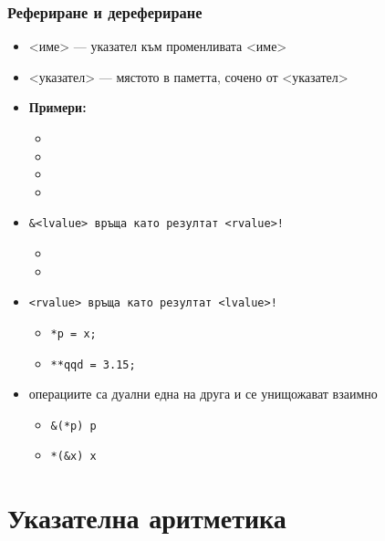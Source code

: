 \documentclass{beamer}
\begin{document}
\begin{frame}
  \frametitle{Рефериране и дерефериране}

  \begin{itemize}[<+->]
  \item \tta{\&}<име> --- указател към променливата <име>
  \item \tta*<указател> --- мястото в паметта, сочено от <указател>
  \item \textbf{Примери:}
    \begin{itemize}
    \item {}
    \item {}
    \item {}
    \item {}
    \end{itemize}
  \item \tt{\&}<lvalue> връща като резултат <rvalue>!
    \begin{itemize}
    \item {}
    \item {}
    \end{itemize}
  \item \tt*<rvalue> връща като резултат <lvalue>!
    \begin{itemize}
    \item \tt{*p = x;}
    \item \tt{**qqd = 3.15;}
    \end{itemize}
  \item операциите са дуални една на друга и се унищожават взаимно
    \begin{itemize}
    \item \tt{\&(*p)} \eqv \tt{p}
    \item \tt{*(\&x)} \eqv \tt{x}
    \end{itemize}
  \end{itemize}
\end{frame}

\section{Указателна аритметика}

\end{document}
